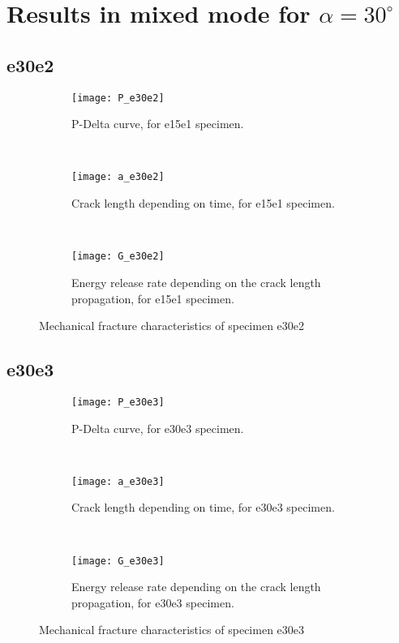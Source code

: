 \section{Results in mixed mode for $\alpha=30 ^\circ$}

\subsection{e30e2}

\begin{figure}[H]
	\centering
	\begin{subfigure}{0.48\linewidth}
		\centering
		\texttt{[image: P\_e30e2]}
		\decoRule
		\caption{P-Delta curve, for e15e1 specimen.}
		\label{fig:P_e30e2}
	\end{subfigure}
	\hfill \\
	\begin{subfigure}{0.48\linewidth}
		\centering
		\texttt{[image: a\_e30e2]}
		\decoRule
		\caption{Crack length depending on time, for e15e1 specimen.}
		\label{fig:a_e30e2}
	\end{subfigure}
	\hfill\\
	\begin{subfigure}{0.48\linewidth}
		\centering
		\texttt{[image: G\_e30e2]}
		\decoRule
		\caption{Energy release rate depending on the crack length propagation, for e15e1 specimen.}
		\label{fig:G_e30e2}
	\end{subfigure}
	\caption{Mechanical fracture characteristics of specimen e30e2}
	\label{e30e2}
\end{figure}

\subsection{e30e3}

\begin{figure}[H]
	\centering
	\begin{subfigure}{0.48\linewidth}
		\centering
		\texttt{[image: P\_e30e3]}
		\decoRule
		\caption{P-Delta curve, for e30e3 specimen.}
		\label{fig:P_e30e3}
	\end{subfigure}
	\hfill \\
	\begin{subfigure}{0.48\linewidth}
		\centering
		\texttt{[image: a\_e30e3]}
		\decoRule
		\caption{Crack length depending on time, for e30e3 specimen.}
		\label{fig:a_e30e3}
	\end{subfigure}
	\hfill\\
	\begin{subfigure}{0.48\linewidth}
		\centering
		\texttt{[image: G\_e30e3]}
		\decoRule
		\caption{Energy release rate depending on the crack length propagation, for e30e3 specimen.}
		\label{fig:G_e30e3}
	\end{subfigure}
	\caption{Mechanical fracture characteristics of specimen e30e3}
	\label{e30e3}
\end{figure}

